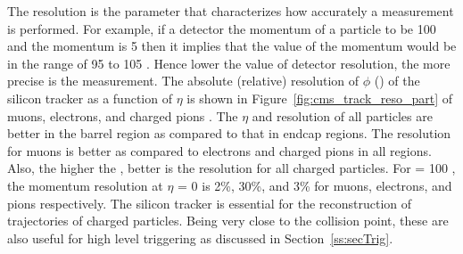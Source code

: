 The resolution is the parameter that characterizes how accurately a measurement
is performed. For example, if a detector  the momentum of a particle
to be 100 \GeV and the momentum  is 5 \GeV then it implies that the 
 value of the momentum would be in the range of 95 to 105 \GeV. Hence lower the 
value of detector resolution, the more precise is the measurement. The absolute 
(relative) resolution of $\phi$ (\pt) of the silicon tracker as a function of $\eta$
is shown in Figure~\ref{fig:cms_track_reso_part} of muons, electrons, and charged
pions \cite{Chatrchyan:2014fea}. The $\eta$ and \pt resolution of all particles are 
better in the barrel region as compared to that in endcap regions. The resolution 
for muons is better as compared to electrons and charged pions in all regions. Also, 
the higher the \pt, better is the resolution for all charged particles. For \pt = 100 \GeV, 
the momentum resolution at $\eta$ = 0 is 2\%, 30\%, and 3\% for muons, electrons, and pions 
respectively.
The silicon tracker is essential for the reconstruction of trajectories of charged particles. 
Being very close to the collision point, these are also useful for high level triggering as discussed 
in Section~\ref{ss:secTrig}. 


